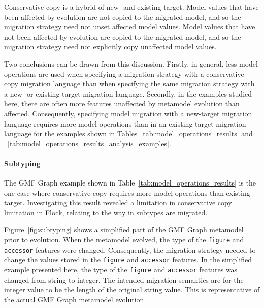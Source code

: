 Conservative copy is a hybrid of new- and existing target. Model values that have been affected by evolution are not copied to the migrated model, and so the migration strategy need not unset affected model values. Model values that have not been affected by evolution are copied to the migrated model, and so the migration strategy need not explicitly copy unaffected model values.

Two conclusions can be drawn from this discussion. Firstly, in general, less model operations are used when specifying a migration strategy with a conservative copy migration language than when specifying the same migration strategy with a new- or existing-target migration language. Secondly, in the examples studied here, there are often more features unaffected by metamodel evolution than affected. Consequently, specifying model migration with a new-target migration language requires more model operations than in an existing-target migration language for the examples shown in Tables~\ref{tab:model_operations_results} and ~\ref{tab:model_operations_results_analysis_examples}.

\paragraph{Subtyping}
The GMF Graph example shown in Table~\ref{tab:model_operations_results} is the one case where conservative copy requires more model operations than existing-target. Investigating this result revealed a limitation in conservative copy limitation in Flock, relating to the way in subtypes are migrated.

Figure~\ref{fig:subtyping} shows a simplified part of the GMF Graph metamodel prior to evolution. When the metamodel evolved, the type of the \texttt{figure} and \texttt{accessor} features were changed. Consequently, the migration strategy needed to change the values stored in the \texttt{figure} and \texttt{accessor} features. In the simplified example presented here, the type of the \texttt{figure} and \texttt{accessor} features was changed from string to integer. The intended migration semantics are for the integer value to be the length of the original string value. This is representative of the actual GMF Graph metamodel evolution.

